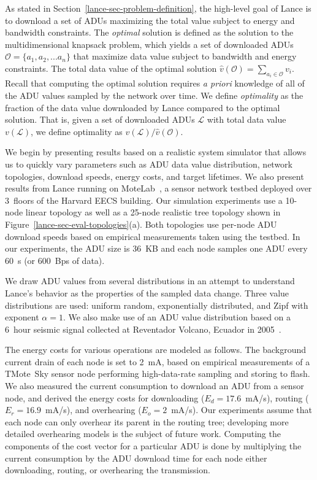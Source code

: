 As stated in Section~\ref{lance-sec-problem-definition}, the high-level goal
of Lance is to download a set of ADUs maximizing the total value subject to
energy and bandwidth constraints. The \textit{optimal} solution is defined as
the solution to the multidimensional knapsack problem, which yields a set of
downloaded ADUs $\mathcal{O} = \{a_1, a_2, ... a_n\}$ that maximize data
value subject to bandwidth and energy constraints. The total data value of
the optimal solution $\hat{v}(\mathcal{O}) = \sum_{a_i \in \mathcal{O}} v_i$.
Recall that computing the optimal solution requires \textit{a priori}
knowledge of all of the ADU values sampled by the network over time. We
define {\em optimality} as the fraction of the data value downloaded by Lance
compared to the optimal solution. That is, given a set of downloaded ADUs
$\mathcal{L}$ with total data value $v(\mathcal{L})$, we define optimality as
$v(\mathcal{L}) / \hat{v}(\mathcal{O})$.

We begin by presenting results based on a realistic system simulator that
allows us to quickly vary parameters such as ADU data value distribution,
network topologies, download speeds, energy costs, and target lifetimes. We
also present results from Lance running on MoteLab~\cite{motelab}, a sensor
network testbed deployed over 3~floors of the Harvard EECS building. Our
simulation experiments use a 10-node linear topology as well as a 25-node
realistic tree topology shown in Figure~\ref{lance-sec-eval-topologies}(a).
Both topologies use per-node ADU download speeds based on empirical
measurements taken using the testbed. In our experiments, the ADU size is
36~KB and each node samples one ADU every 60~s (or 600~Bps of data).

We draw ADU values from several distributions in an attempt to understand
Lance's behavior as the properties of the sampled data change. Three value
distributions are used: uniform random, exponentially distributed, and Zipf
with exponent $\alpha = 1$. We also make use of an ADU value distribution
based on a 6~hour seismic signal collected at Reventador Volcano, Ecuador in
2005~\cite{volcano-osdi06}.

The energy costs for various operations are modeled as follows. The
background current drain of each node is set to 2~mA, based on empirical
measurements of a TMote~Sky sensor node performing high-data-rate sampling
and storing to flash. We also measured the current consumption to download an
ADU from a sensor node, and derived the energy costs for downloading ($E_d =
17.6$~mA/s), routing ($E_r = 16.9$~mA/s), and overhearing ($E_o = 2$~mA/s).
Our experiments assume that each node can only overhear its parent in the
routing tree; developing more detailed overhearing models is the subject of
future work. Computing the components of the cost vector for a particular ADU
is done by multiplying the current consumption by the ADU download time for
each node either downloading, routing, or overhearing the transmission.

